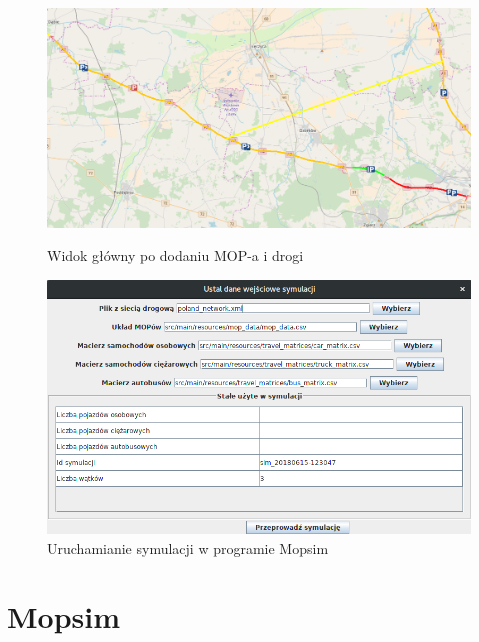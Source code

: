 \begin{figure}
  \begin{minipage}{.5\textwidth}
    \centering
    \includegraphics[width=.9\linewidth]{images/mopnik/dodany_mop_droga.png}
    \captionsetup{width=.9\linewidth}
    \caption{Widok główny po dodaniu MOP-a i drogi}
  \end{minipage}%
  \begin{minipage}{.5\textwidth}
    \centering
    \includegraphics[width=.9\linewidth]{images/mopnik/symulacje.png}
    \captionsetup{width=.9\linewidth}
    \caption{Uruchamianie symulacji w programie Mopsim}
  \end{minipage}
\end{figure}

\chapter{Mopsim}\label{r:Mopsim}

